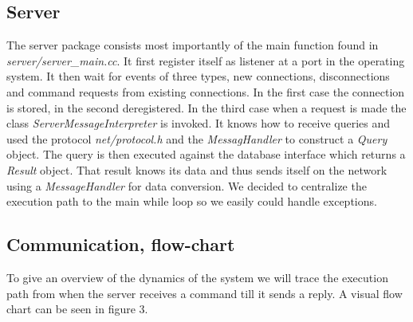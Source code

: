 \documentclass[10pt, a4paper]{article}
\begin{document}
\subsection{Server}
The server package consists most importantly of the main function found in \emph{server/server\_main.cc}. It first register itself as listener at a port in the operating system. It then wait for events of three types, new connections, disconnections and command requests from existing connections. In the first case the connection is stored, in the second deregistered. In the third case when a request is made the class \emph{ServerMessageInterpreter} is invoked. It knows how to receive queries and used the protocol \emph{net/protocol.h} and the \emph{MessagHandler} to construct a \emph{Query} object. The query is then executed against the database interface which returns a \emph{Result} object. That result knows its data and thus sends itself on the network using a \emph{MessageHandler} for data conversion. We decided to centralize the execution path to the main while loop so we easily could handle exceptions.

\subsection{Communication, flow-chart}
To give an overview of the dynamics of the system we will trace the execution path from when the server receives a command till it sends a reply. A visual flow chart can be seen in figure 3.
\end{document}
